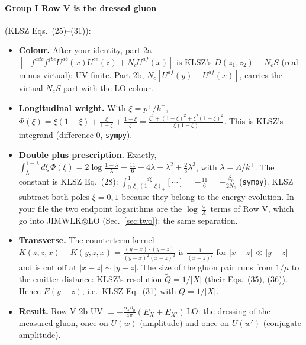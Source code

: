 \documentclass[10pt]{article}
\numberwithin{equation}{section}
\begin{document}
\paragraph{Group I Row V is the dressed gluon} (KLSZ Eqs.~(25)--(31)):
\begin{itemize}
\item \textbf{Colour.} After your identity, part 2a $[-f^{adc}f^{fbe}U^{db}(x)U^{ce}(z)+N_cU^{af}(x)]$ is KLSZ's $D(z_1,z_2)-N_cS$ (real minus virtual): UV finite. Part 2b, $N_c[U^{af}(y)-U^{af}(x)]$, carries the virtual $N_cS$ part with the LO colour.
\item \textbf{Longitudinal weight.} With $\xi=p^+/k^+$, $\Phi(\xi)=\xi(1-\xi)+\frac{\xi}{1-\xi}+\frac{1-\xi}{\xi}=\frac{\xi^2+(1-\xi)^2+\xi^2(1-\xi)^2}{\xi(1-\xi)}$. This is KLSZ's integrand (difference 0, \texttt{sympy}).
\item \textbf{Double plus prescription.} Exactly, $\int_{\lambda}^{1-\lambda}d\xi\,\Phi(\xi)=2\log\frac{1-\lambda}{\lambda}-\frac{11}{6}+4\lambda-\lambda^2+\frac23\lambda^3$, with $\lambda=\Lambda/k^+$. The constant is KLSZ Eq.~(28): $\int_0^1\frac{d\xi}{\xi_+(1-\xi)_+}[\cdots]=-\frac{11}{6}=-\frac{\beta_0}{2N_c}$ (\texttt{sympy}). KLSZ subtract both poles $\xi=0,1$ because they belong to the energy evolution. In your file the two endpoint logarithms are the $\log\frac{\vee}{\Lambda}$ terms of Row V, which go into JIMWLK$\otimes$LO (Sec.~\ref{sec:two}): the same separation.
\item \textbf{Transverse.} The counterterm kernel $K(z,z,x)-K(y,z,x)=\frac{(y-x)\cdot(y-z)}{(y-x)^2(x-z)^2}$ is $\frac{1}{(x-z)^2}$ for $|x-z|\ll|y-z|$ and is cut off at $|x-z|\sim|y-z|$. The size of the gluon pair runs from $1/\mu$ to the emitter distance: KLSZ's resolution $\tilde Q=1/|X|$ (their Eqs.~(35), (36)). Hence $E(y-z)$, i.e.\ KLSZ Eq.~(31) with $Q=1/|X|$.
\item \textbf{Result.} Row V 2b UV $=-\frac{\alpha_s\beta_0}{4\pi}(E_X+E_{X'})\,$LO: the dressing of the measured gluon, once on $U(w)$ (amplitude) and once on $U(w')$ (conjugate amplitude).
\end{itemize}
\end{document}

